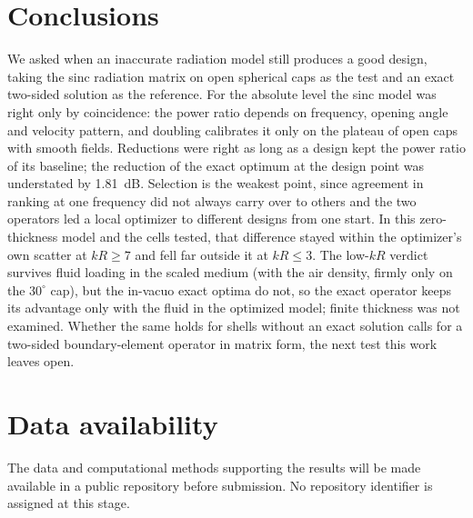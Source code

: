 \documentclass[preprint,12pt]{elsarticle}
\makeatletter
\renewcommand{\floatpagefraction}{0.75}
\newcommand{\appendixfloats}{%
  \@addtoreset{figure}{section}\@addtoreset{table}{section}%
  \renewcommand{\theHfigure}{app.\Alph{section}.\arabic{figure}}%
  \renewcommand{\theHtable}{app.\Alph{section}.\arabic{table}}%
  \renewcommand{\theHequation}{app.\Alph{section}.\arabic{equation}}%
  \renewcommand{\floatpagefraction}{0.5}}
\makeatother
\begin{document}
\section{Conclusions}
\label{sec:conclusions}
We asked when an inaccurate radiation model still produces a good design, taking the sinc radiation matrix on open spherical caps as the test and an exact two-sided solution as the reference. For the absolute level the sinc model was right only by coincidence: the power ratio depends on frequency, opening angle and velocity pattern, and doubling calibrates it only on the plateau of open caps with smooth fields. Reductions were right as long as a design kept the power ratio of its baseline; the reduction of the exact optimum at the design point was understated by 1.81~dB. Selection is the weakest point, since agreement in ranking at one frequency did not always carry over to others and the two operators led a local optimizer to different designs from one start. In this zero-thickness model and the cells tested, that difference stayed within the optimizer's own scatter at $kR\ge7$ and fell far outside it at $kR\le3$. The low-$kR$ verdict survives fluid loading in the scaled medium (with the air density, firmly only on the $30^\circ$ cap), but the in-vacuo exact optima do not, so the exact operator keeps its advantage only with the fluid in the optimized model; finite thickness was not examined. Whether the same holds for shells without an exact solution calls for a two-sided boundary-element operator in matrix form, the next test this work leaves open.

\section*{Data availability}
The data and computational methods supporting the results will be made available in a public repository before submission. No repository identifier is assigned at this stage.




\appendix
\appendixfloats
\end{document}
